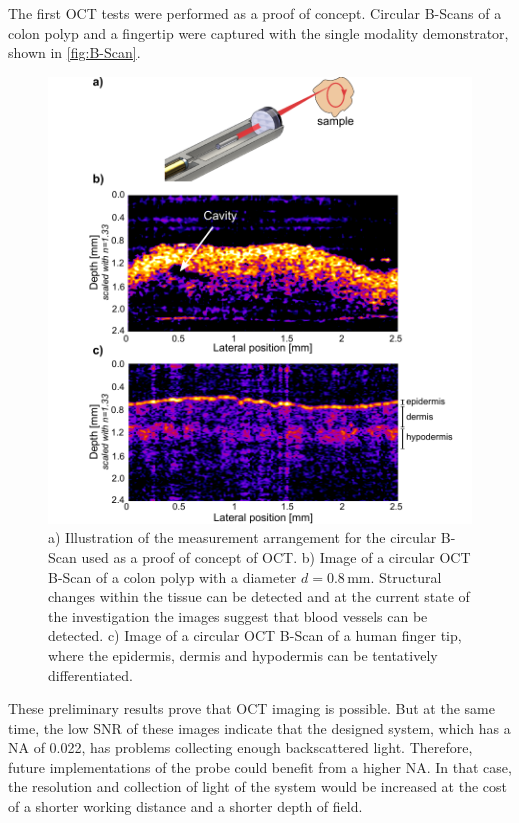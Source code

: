 The first OCT tests were performed as a proof of concept. Circular B-Scans of a colon polyp and a fingertip were captured with the single modality demonstrator, shown in \autoref{fig:B-Scan}. 
\begin{figure}[h!]\centering \includegraphics{figures/50_Measurements/oct/OCT_Measurement_arrangement.pdf}
      \caption{a) Illustration of the measurement arrangement for the circular B-Scan used as a proof of concept of OCT. b) Image of a circular OCT B-Scan of a colon polyp with a diameter $d=0.8\,\text{mm}$. Structural changes within the tissue can be detected and at the current state of the investigation the images suggest that blood vessels can be detected.
      c) Image of a circular OCT B-Scan of a human finger tip, where the epidermis, dermis and hypodermis can be tentatively differentiated.}
      \label{fig:B-Scan}
\end{figure}
These preliminary results prove that OCT imaging is possible. But at the same time, the low SNR of these images indicate that the designed system, which has a NA of 0.022, has problems collecting enough backscattered light. Therefore, future implementations of the probe could benefit from a higher NA. In that case, the resolution and collection of light of the system would be increased at the cost of a shorter working distance and a shorter depth of field. 